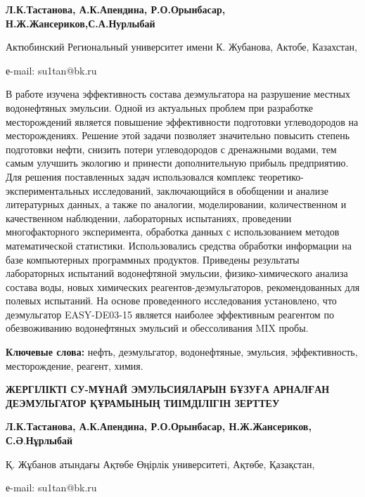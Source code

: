 \textbf{Л.К.Тастанова, А.К.Апендина, Р.О.Орынбасар,
Н.Ж.Жансериков,С.А.Нурлыбай}

Актюбинский Региональный университет имени К. Жубанова, Актобе,
Казахстан,

е-mail: su1tan@bk.ru

В работе изучена эффективность состава деэмульгатора на разрушение
местных водонефтяных эмульсии. Одной из актуальных проблем при
разработке месторождений является повышение эффективности подготовки
углеводородов на месторождениях. Решение этой задачи позволяет
значительно повысить степень подготовки нефти, снизить потери
углеводородов с дренажными водами, тем самым улучшить экологию и
принести дополнительную прибыль предприятию. Для решения поставленных
задач использовался комплекс теоретико-экспериментальных исследований,
заключающийся в обобщении и анализе литературных данных, а также по
аналогии, моделировании, количественном и качественном наблюдении,
лабораторных испытаниях, проведении многофакторного эксперимента,
обработка данных с использованием методов математической статистики.
Использовались средства обработки информации на базе компьютерных
программных продуктов. Приведены результаты лабораторных испытаний
водонефтяной эмульсии, физико-химического анализа состава воды, новых
химических реагентов-деэмульгаторов, рекомендованных для полевых
испытаний. На основе проведенного исследования установлено, что
деэмульгатор EASY-DE03-15 является наиболее эффективным реагентом по
обезвоживанию водонефтяных эмульсий и обессоливания MIX пробы.

\textbf{Ключевые слова:} нефть, деэмульгатор, водонефтяные, эмульсия,
эффективность, месторождение, реагент, химия.

\textbf{ЖЕРГІЛІКТІ СУ-МҰНАЙ ЭМУЛЬСИЯЛАРЫН БҰЗУҒА АРНАЛҒАН ДЕЭМУЛЬГАТОР
ҚҰРАМЫНЫҢ ТИІМДІЛІГІН ЗЕРТТЕУ}

\textbf{Л.К.Тастанова, А.К.Апендина, Р.О.Орынбасар, Н.Ж.Жансериков,
С.Ә}.\textbf{Нұрлыбай}

Қ. Жұбанов атындағы Ақтөбе Өңірлік университеті, Ақтөбе, Қазақстан,

е-mail: su1tan@bk.ru

